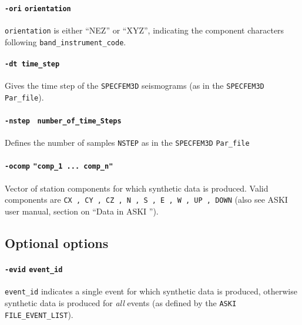 \documentclass[12pt,a4paper]{article}
\newcommand{\lcode}[1]{\nolinkurl{#1}}
\newcommand{\ASKI}{ {\ttfamily ASKI} }
\begin{document}
\paragraph{\lcode{-ori} \lcode{orientation}}
\lcode{orientation} is either ``NEZ'' or ``XYZ'', indicating the component characters following 
\lcode{band_instrument_code}.

\paragraph{\lcode{-dt time_step}}
Gives the time step of the \lcode{SPECFEM3D} seismograms (as in the \lcode{SPECFEM3D} \lcode{Par_file}).

\paragraph{\lcode{-nstep} \lcode{ number_of_time_Steps}}
Defines the number of samples \lcode{NSTEP} as in the \lcode{SPECFEM3D} \lcode{Par_file}

\paragraph{\lcode{-ocomp} \lcode{"comp_1 ... comp_n"}}
Vector of station components for which synthetic data is produced. Valid components are
\lcode{CX , CY , CZ , N , S , E , W , UP , DOWN}
(also see \ASKI{} user manual, section on ``Data in \ASKI{}'').


\subsection*{Optional options}

\paragraph{\lcode{-evid} \lcode{event_id}}
\lcode{event_id} indicates a single event for which synthetic data is produced, otherwise synthetic data 
is produced for \emph{all} events (as defined by the \lcode{ASKI} \lcode{ FILE_EVENT_LIST}).
\end{document}
